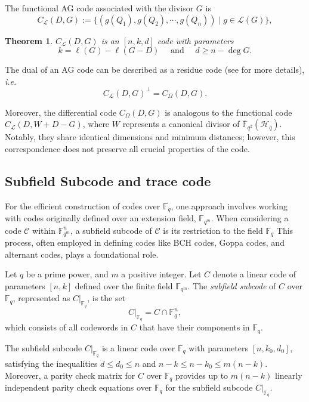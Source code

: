 \documentclass[a4paper]{amsart}
\theoremstyle{plain}
\newtheorem{theorem}{Theorem}[section]
\theoremstyle{definition}
\theoremstyle{remark}
\newcommand{\calL}{\mathcal{L}}
\newcommand{\calC}{\mathcal{C}}
\begin{document}
The functional AG code associated with the divisor $G$ is
\[C_{\calL}(D,G) := \{(g(Q_1),g(Q_2),\cdots,g(Q_n)) \mid g \in \calL(G)\},\]




\begin{theorem}\cite[Theorem~2.2.2]{stichtenoth2009algebraic}
	$C_{\calL}(D, G)$ is an $[n, k, d]$ code with parameters
	\[
		k=\ell(G)-\ell(G-D) \quad \text { and } \quad d \geq n-\deg G .
	\]
\end{theorem}

The dual of an AG code can be described as a residue code (see \cite{stichtenoth2009algebraic} for more details), \emph{i.e.}
\[ C_{\calL}(D,G)^{\perp} = C_{\Omega}(D,G).\]


Moreover, the differential code $C_{\Omega}(D, G)$ is analogous to the functional code $C_{\mathcal{L}}(D, W+D-G)$, where $W$ represents a canonical divisor of $\overline{\mathbb{F}}_{q^2}(\mathscr{H}_q)$. Notably, they share identical dimensions and minimum distances; however, this correspondence does not preserve all crucial properties of the code.


\subsection*{Subfield Subcode and trace code}
For the efficient construction of codes over $\mathbb{F}_q$, one approach involves working with codes originally defined over an extension field, $\mathbb{F}_{q^m}$. When considering a code $\calC$ within $\mathbb{F}_{q^m}^n$, a subfield subcode of $\calC$ is its restriction to the field $\mathbb{F}_q$
This process, often employed in defining codes like BCH codes, Goppa codes, and alternant codes, plays a foundational role.

Let $q$ be a prime power, and $m$ a positive integer. Let $C$ denote a linear code of parameters $[n,k]$ defined over the finite field $\mathbb{F}_{q^m}$. The \emph{subfield subcode} of $C$ over $\mathbb{F}_q$, represented as $C|_{\mathbb{F}_q}$, is the set
\[
	C|_{\mathbb{F}_q} = C \cap \mathbb{F}_q^n,
\]
which consists of all codewords in $C$ that have their components in $\mathbb{F}_q$. 


The subfield subcode $C|_{\mathbb{F}_q}$ is a linear code over $\mathbb{F}_q$ with parameters $[n,k_0,d_0]$, satisfying the inequalities $d \leq d_0 \leq n$ and $n-k \leq n-k_0 \leq m(n-k)$. Moreover, a parity check matrix for $C$ over $\mathbb{F}_q$ provides up to $m(n-k)$ linearly independent parity check equations over $\mathbb{F}_q$ for the subfield subcode $C|_{\mathbb{F}_q}$.
\end{document}
